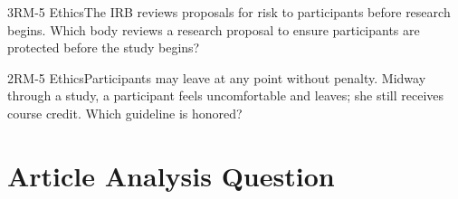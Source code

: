 \documentclass[11pt]{article}
\begin{document}
\begin{q}{3}{RM-5 Ethics}{The IRB reviews proposals for risk to participants before research begins.}
Which body reviews a research proposal to ensure participants are protected before the study begins?
\end{q}

\begin{q}{2}{RM-5 Ethics}{Participants may leave at any point without penalty.}
Midway through a study, a participant feels uncomfortable and leaves; she still receives course credit. Which guideline is honored?
\end{q}

\section{Article Analysis Question}
\end{document}
